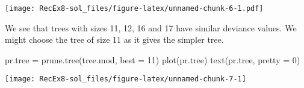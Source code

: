 \documentclass[
]{article}
\newenvironment{Shaded}{\begin{snugshade}}{\end{snugshade}}
\newcommand{\AttributeTok}[1]{\textcolor[rgb]{0.77,0.63,0.00}{#1}}
\newcommand{\DecValTok}[1]{\textcolor[rgb]{0.00,0.00,0.81}{#1}}
\newcommand{\FunctionTok}[1]{\textcolor[rgb]{0.00,0.00,0.00}{#1}}
\newcommand{\NormalTok}[1]{#1}
\newcommand{\OtherTok}[1]{\textcolor[rgb]{0.56,0.35,0.01}{#1}}
\newcommand{\SpecialCharTok}[1]{\textcolor[rgb]{0.00,0.00,0.00}{#1}}
\newcommand{\StringTok}[1]{\textcolor[rgb]{0.31,0.60,0.02}{#1}}
\begin{document}
\begin{Shaded}
\end{Shaded}

\texttt{[image: RecEx8-sol\_files/figure-latex/unnamed-chunk-6-1.pdf]}

We see that trees with sizes 11, 12, 16 and 17 have similar deviance
values. We might choose the tree of size 11 as it gives the simpler
tree.

\begin{Shaded}
\begin{Highlighting}[]
\NormalTok{pr.tree }\OtherTok{=} \FunctionTok{prune.tree}\NormalTok{(tree.mod, }\AttributeTok{best =} \DecValTok{11}\NormalTok{)}
\FunctionTok{plot}\NormalTok{(pr.tree)}
\FunctionTok{text}\NormalTok{(pr.tree, }\AttributeTok{pretty =} \DecValTok{0}\NormalTok{)}
\end{Highlighting}
\end{Shaded}

\texttt{[image: RecEx8-sol\_files/figure-latex/unnamed-chunk-7-1]}

\begin{Shaded}
\end{Shaded}
\end{document}
